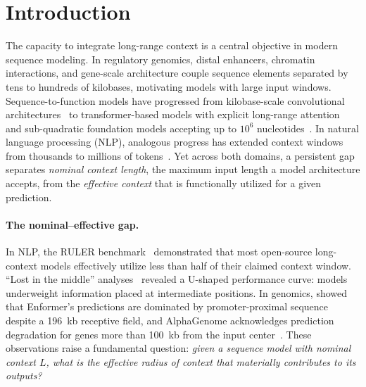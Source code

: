 \section{Introduction}\label{sec:intro}

The capacity to integrate long-range context is a central objective in modern sequence modeling. In regulatory genomics, distal enhancers, chromatin interactions, and gene-scale architecture couple sequence elements separated by tens to hundreds of kilobases, motivating models with large input windows. Sequence-to-function models have progressed from kilobase-scale convolutional architectures~\citep{Zhou2015DeepSEA,Kelley2016Basset,Kelley2018Basenji,Kelley2020Basenji2} to transformer-based models with explicit long-range attention~\citep{Avsec2021Enformer,Linder2025Borzoi} and sub-quadratic foundation models accepting up to $10^6$ nucleotides~\citep{Nguyen2023HyenaDNA,Nguyen2024Evo,Schiff2024Caduceus,Brixi2025Evo2}. In natural language processing (NLP), analogous progress has extended context windows from thousands to millions of tokens~\citep{Vaswani2017Transformer,Hsieh2024RULER}. Yet across both domains, a persistent gap separates \emph{nominal context length}, the maximum input length a model architecture accepts, from the \emph{effective context} that is functionally utilized for a given prediction.

\paragraph{The nominal--effective gap.}
In NLP, the RULER benchmark~\citep{Hsieh2024RULER} demonstrated that most open-source long-context models effectively utilize less than half of their claimed context window. ``Lost in the middle'' analyses~\citep{Liu2024LostInMiddle} revealed a U-shaped performance curve: models underweight information placed at intermediate positions. In genomics, \citet{Karollus2023Limited} showed that Enformer's predictions are dominated by promoter-proximal sequence despite a 196~kb receptive field, and AlphaGenome acknowledges prediction degradation for genes more than 100~kb from the input center~\citep{Benegas2026AlphaGenome}. These observations raise a fundamental question: \emph{given a sequence model with nominal context $L$, what is the effective radius of context that materially contributes to its outputs?}

